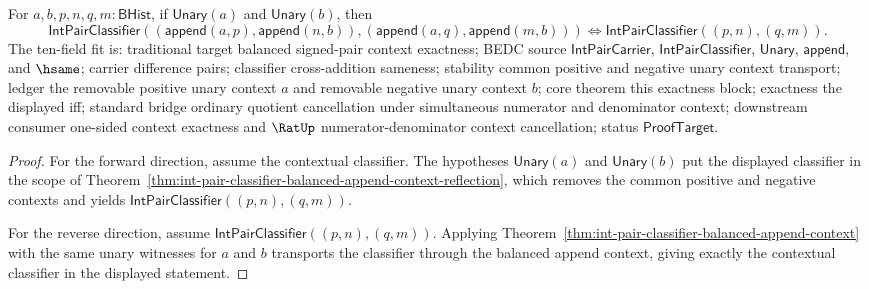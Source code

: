 \begin{theorem}
\label{thm:int-pair-classifier-balanced-append-context-exactness}
For $a,b,p,n,q,m:\mathsf{BHist}$, if $\mathsf{Unary}(a)$ and
$\mathsf{Unary}(b)$, then
$$
\mathsf{IntPairClassifier}
((\mathsf{append}(a,p),\mathsf{append}(n,b)),
(\mathsf{append}(a,q),\mathsf{append}(m,b)))
\Longleftrightarrow
\mathsf{IntPairClassifier}((p,n),(q,m)).
$$
The ten-field fit is: traditional target balanced signed-pair context
exactness; BEDC source $\mathsf{IntPairCarrier}$,
$\mathsf{IntPairClassifier}$, $\mathsf{Unary}$, $\mathsf{append}$, and
$\hsame$; carrier difference pairs; classifier cross-addition sameness;
stability common positive and negative unary context transport; ledger the
removable positive unary context $a$ and removable negative unary context $b$;
core theorem this exactness block; exactness the displayed iff; standard bridge
ordinary quotient cancellation under simultaneous numerator and denominator
context; downstream consumer one-sided context exactness and $\RatUp$
numerator-denominator context cancellation; status $\mathsf{ProofTarget}$.
\end{theorem}
\begin{proof}
For the forward direction, assume the contextual classifier. The hypotheses
$\mathsf{Unary}(a)$ and $\mathsf{Unary}(b)$ put the displayed classifier in the
scope of Theorem~\ref{thm:int-pair-classifier-balanced-append-context-reflection},
which removes the common positive and negative contexts and yields
$\mathsf{IntPairClassifier}((p,n),(q,m))$.

For the reverse direction, assume
$\mathsf{IntPairClassifier}((p,n),(q,m))$. Applying
Theorem~\ref{thm:int-pair-classifier-balanced-append-context} with the same
unary witnesses for $a$ and $b$ transports the classifier through the balanced
append context, giving exactly the contextual classifier in the displayed
statement.
\end{proof}

